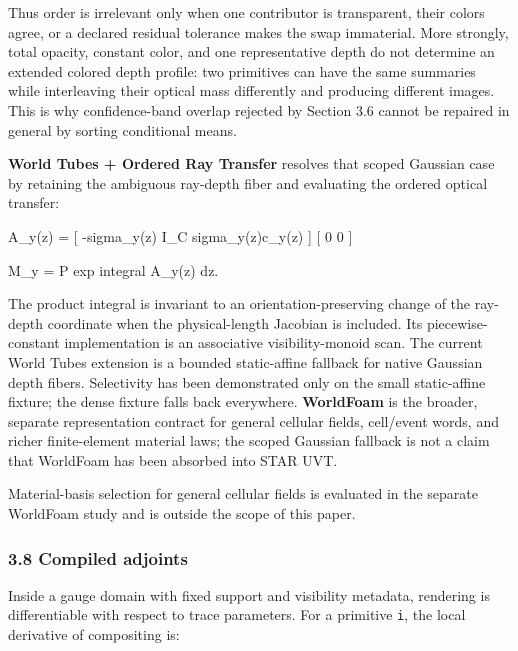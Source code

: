 \documentclass[
]{article}
\newenvironment{Shaded}{}{}
\newcommand{\NormalTok}[1]{#1}
\begin{document}
Thus order is irrelevant only when one contributor is transparent, their
colors agree, or a declared residual tolerance makes the swap
immaterial. More strongly, total opacity, constant color, and one
representative depth do not determine an extended colored depth profile:
two primitives can have the same summaries while interleaving their
optical mass differently and producing different images. This is why
confidence-band overlap rejected by Section 3.6 cannot be repaired in
general by sorting conditional means.

\textbf{World Tubes + Ordered Ray Transfer} resolves that scoped
Gaussian case by retaining the ambiguous ray-depth fiber and evaluating
the ordered optical transfer:

\begin{Shaded}
\begin{Highlighting}[]
\NormalTok{A\_y(z) =}
\NormalTok{  [ {-}sigma\_y(z) I\_C    sigma\_y(z)c\_y(z) ]}
\NormalTok{  [ 0                  0                 ]}

\NormalTok{M\_y = P exp integral A\_y(z) dz.}
\end{Highlighting}
\end{Shaded}

The product integral is invariant to an orientation-preserving change of
the ray-depth coordinate when the physical-length Jacobian is included.
Its piecewise-constant implementation is an associative
visibility-monoid scan. The current World Tubes extension is a bounded
static-affine fallback for native Gaussian depth fibers. Selectivity has
been demonstrated only on the small static-affine fixture; the dense
fixture falls back everywhere. \textbf{WorldFoam} is the broader,
separate representation contract for general cellular fields, cell/event
words, and richer finite-element material laws; the scoped Gaussian
fallback is not a claim that WorldFoam has been absorbed into STAR UVT.

Material-basis selection for general cellular fields is evaluated in the
separate WorldFoam study and is outside the scope of this paper.

\subsubsection{3.8 Compiled adjoints}\label{compiled-adjoints}

Inside a gauge domain with fixed support and visibility metadata,
rendering is differentiable with respect to trace parameters. For a
primitive \texttt{i}, the local derivative of compositing is:
\end{document}
